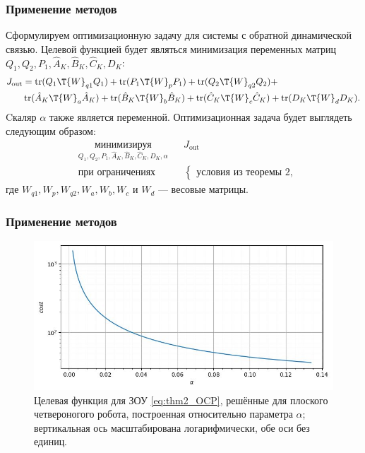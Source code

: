 \begin{frame}
	\frametitle{Применение методов}
	Сформулируем оптимизационную задачу для системы с обратной динамической связью.
	Целевой функцией будет являться минимизация переменных матриц ${Q}_1, {Q}_2, {P}_1, {\hat{A}}_K, {\hat{B}}_K,{\hat{C}}_K, {D}_K$:
	\begin{align}
		\label{eq:cost_output}
		J_\text{out} &= \operatorname{tr}({Q}_1\T{W}_{q1}{Q}_1) + \operatorname{tr}({P}_1\T{W}_p{P}_1) + \operatorname{tr}({Q}_2\T{W}_{q2}{Q}_2) + \\
		 &\operatorname{tr}({\hat{A}}_K\T{W}_a{\hat{A}}_K) + \operatorname{tr}({\hat{B}}_K\T{W}_b{\hat{B}}_K) + \operatorname{tr}({\hat{C}}_K\T{W}_c{\hat{C}}_K) + \operatorname{tr}({D}_K\T{W}_d{D}_K). \nonumber
	\end{align}
	Cкаляр $\alpha$ также является переменной. Оптимизационная задача будет выглядеть следующим образом:
	\begin{equation}
		\begin{aligned}
			\label{eq:thm2_OCP}
			& \underset{{Q}_1, {Q}_2, {P}_1, {\hat{A}}_K, {\hat{B}}_K,{\hat{C}}_K, {D}_K, \alpha }{\text{минимизируя}}
			& & J_\text{out}\\
			& \text{при ограничениях}
			& & \begin{cases}
				\text{условия из теоремы 2},
			\end{cases}
		\end{aligned}
	\end{equation}
	где ${W}_{q1}, {W}_p, {W}_{q2}, {W}_a, {W}_b, {W}_c$ и ${W}_d$ --- весовые матрицы.
\end{frame}

\begin{frame}
	\frametitle{Применение методов}
	\begin{figure}
	\centering
	\includegraphics[scale=0.85]{images/output_cost.JPG}
	\caption{Целевая функция для ЗОУ \eqref{eq:thm2_OCP}, решённые для плоского четвероногого робота, построенная относительно параметра $\alpha$; вертикальная ось масштабирована логарифмически, обе оси без единиц.}
	\label{fig:cost_output}
	\end{figure}
\end{frame}

